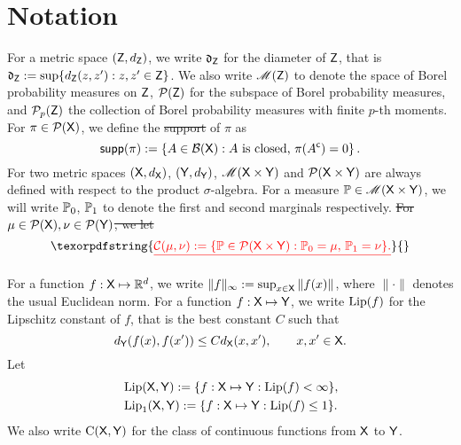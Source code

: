 \documentclass[11pt,a4paper]{article}
\providecommand{\DIFaddtex}[1]{{\protect\color{blue}\uwave{#1}}} %
\providecommand{\DIFdeltex}[1]{{\protect\color{red}\sout{#1}}}                      %
\providecommand{\DIFaddbegin}{} %
\providecommand{\DIFaddend}{} %
\providecommand{\DIFdelbegin}{} %
\providecommand{\DIFdelend}{} %
\providecommand{\DIFadd}[1]{\texorpdfstring{\DIFaddtex{#1}}{#1}} %
\providecommand{\DIFdel}[1]{\texorpdfstring{\DIFdeltex{#1}}{}} %
\begin{document}
\section{Notation}
\label{sec:notation}
For a metric space $(\mathsf{Z}, d_{\mathsf{Z}})$, we write \DIFdelbegin \DIFdel{$\mathfrak{d}_{\mathsf{Z}}$ }\DIFdelend \DIFaddbegin \DIFadd{$\mathfrak{d}_\msz$ }\DIFaddend for the diameter of $\mathsf{Z}$, that is \DIFdelbegin \DIFdel{$\mathfrak{d}_{\mathsf{Z}}:= \sup\{d_{\mathsf{Z}}(z,z'): z,z' \in \mathsf{Z}\}$}\DIFdelend \DIFaddbegin \DIFadd{$d_\msz:= \sup\{d_\msz(z,z'): z,z' \in \msz\}$}\DIFaddend . We also write $\mathscr{M}(\mathsf{Z})$ to denote the space of Borel probability measures on $\mathsf{Z}$, $\mathcal{P}(\mathsf{Z})$ for the subspace of Borel probability measures, and $\mathcal{P}_p(\mathsf{Z})$ the collection of Borel probability measures with finite $p$-th moments.
For $\pi \in \mathcal{P}(\mathsf{X})$, we define the \DIFdelbegin \DIFdel{support }\DIFdelend \DIFaddbegin \DIFadd{suport }\DIFaddend of $\pi$ as  $$\mathsf{supp}(\pi):= \left\{A\in \mathcal{B}(\mathsf{X}): \text{$A$ is closed, $\pi(A^\textsf{c})=0$} \right\}.$$
For two metric spaces $(\mathsf{X}, d_{\mathsf{X}})$, $(\mathsf{Y}, d_{\mathsf{Y}})$,  $\mathscr{M}(\mathsf{X}\times \mathsf{Y})$ and $\mathcal{P}(\mathsf{X}\times\mathsf{Y})$ are always defined with respect to the product $\sigma$-algebra. For a measure $\mathbb{P}\in \mathscr{M}(\mathsf{X}\times\mathsf{Y})$, we will write $\mathbb{P}_0$, $\mathbb{P}_1$ to denote the first and second marginals respectively. 
\DIFdelbegin \DIFdel{For $\mu\in \mathcal{P}(\mathsf{X}), \nu \in \mathcal{P}(\mathsf{Y})$, we let 
}\begin{displaymath}\DIFdel{\mathcal{C}(\mu, \nu) := \{\mathbb{P}\in \Pens(\msx \times \msy): \mathbb{P}_0=\mu,\, \mathbb{P}_1=\nu\}.}\end{displaymath}%
\DIFdelend 

For a function $f:\mathsf{X} \mapsto \mathbb{R}^d$, we write $\|f\|_\infty:= \sup_{x\in \mathsf{X}} \| f(x)\|$,
where $\|\cdot\|$ denotes the usual Euclidean norm. For a function $f:\mathsf{X} \mapsto \mathsf{Y}$, we write $\operatorname{Lip}(f)$ for the Lipschitz constant of $f$, that is the best constant $C$ such that 
$$d_{\mathsf{Y}}(f(x), f(x')) \leq C d_{\mathsf{X}}(x,x'), \qquad x, x' \in \mathsf{X}.$$
Let  
\begin{align}
    &\operatorname{Lip}(\mathsf{X}, \mathsf{Y}) := \{f: \mathsf{X} \mapsto \mathsf{Y}: \operatorname{Lip}(f)<\infty\},\\
    &\operatorname{Lip}_1(\mathsf{X}, \mathsf{Y}) := \{f: \mathsf{X} \mapsto \mathsf{Y}: \operatorname{Lip}(f)\leq 1\}.
\end{align}
We also write $\mathrm{C}(\mathsf{X}, \mathsf{Y})$ for the class of continuous functions from $\mathsf{X}$ to $\mathsf{Y}$.
\end{document}
